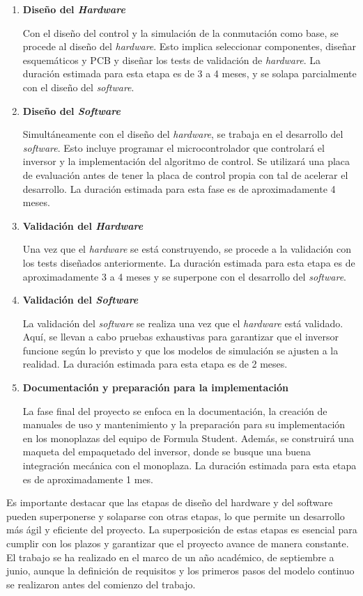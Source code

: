 \begin{enumerate}
\item \textbf{Diseño del \textit{Hardware}}

Con el diseño del control y la simulación de la conmutación como base, se procede al diseño del \textit{hardware}. Esto implica seleccionar componentes, diseñar esquemáticos y PCB y diseñar los tests de validación de \textit{hardware}. La duración estimada para esta etapa es de 3 a 4 meses, y se solapa parcialmente con el diseño del \textit{software}.

\item \textbf{Diseño del \textit{Software}}

Simultáneamente con el diseño del \textit{hardware}, se trabaja en el desarrollo del \textit{software}. Esto incluye programar el microcontrolador que controlará el inversor y la implementación del algoritmo de control. Se utilizará una placa de evaluación antes de tener la placa de control propia con tal de acelerar el desarrollo. La duración estimada para esta fase es de aproximadamente 4 meses.

\item \textbf{Validación del \textit{Hardware}}

Una vez que el \textit{hardware} se está construyendo, se procede a la validación con los tests diseñados anteriormente. La duración estimada para esta etapa es de aproximadamente 3 a 4 meses y se superpone con el desarrollo del \textit{software}.

\item \textbf{Validación del \textit{Software}}

La validación del \textit{software} se realiza una vez que el \textit{hardware} está validado. Aquí, se llevan a cabo pruebas exhaustivas para garantizar que el inversor funcione según lo previsto y que los modelos de simulación se ajusten a la realidad. La duración estimada para esta etapa es de 2 meses.

\item \textbf{Documentación y preparación para la implementación}

La fase final del proyecto se enfoca en la documentación, la creación de manuales de uso y mantenimiento y la preparación para su implementación en los monoplazas del equipo de Formula Student. Además, se construirá una maqueta del empaquetado del inversor, donde se busque una buena integración mecánica con el monoplaza. La duración estimada para esta etapa es de aproximadamente 1 mes. 

\end{enumerate}

Es importante destacar que las etapas de diseño del hardware y del software pueden superponerse y solaparse con otras etapas, lo que permite un desarrollo más ágil y eficiente del proyecto. La superposición de estas etapas es esencial para cumplir con los plazos y garantizar que el proyecto avance de manera constante. El trabajo se ha realizado en el marco de un año académico, de septiembre a junio, aunque la definición de requisitos y los primeros pasos del modelo continuo se realizaron antes del comienzo del trabajo.


